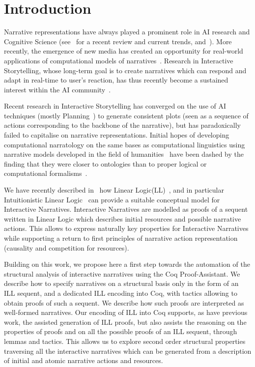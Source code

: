 \documentclass[runningheads,a4paper]{llncs}
\begin{document}
\section{Introduction}
%
Narrative representations have always played a prominent role in AI research and Cognitive Science (see~\cite{Richards09} for a recent review and current trends, and~\cite{AAAI10}). More recently, the emergence of new media has created an opportunity for real-world applications of computational models of narratives~\cite{Laurel93,Murray98}. Research in Interactive Storytelling, whose long-term goal is to create narratives which can respond and adapt in real-time to user's reaction, has thus recently become a sustained interest within the AI community~\cite{AAAI07,AAAI09}.

Recent research in Interactive Storytelling has converged on the use of AI techniques (mostly Planning~\cite{Young99}) to generate consistent plots (seen as a sequence of actions corresponding to the backbone of the narrative), but has paradoxically failed to capitalise on narrative representations. Initial hopes of developing computational narratology on the same bases as computational linguistics using narrative models developed in the field of humanities~\cite{Greimas66,Bremond73} have been dashed by the finding that they were closer to ontologies than to proper logical or computational formalisms~\cite{Cavazza06}.

We have recently described in~\cite{bosser10} how Linear Logic(LL)~\cite{GirardTCS87}, and in particular Intuitionistic Linear Logic~\cite{GirardILL87} can provide a suitable conceptual model for Interactive Narratives. Interactive Narratives are modelled as proofs of a sequent written in Linear Logic which describes initial resources and possible narrative actions. This allows to express naturally key properties for Interactive Narratives while supporting a return to first principles of narrative action representation (causality and competition for resources).

Building on this work, we propose here a first step towards the automation of the structural analysis of interactive narratives using the Coq Proof-Assistant. We describe how to specify narratives on a structural basis only in the form of an ILL sequent, and a dedicated ILL encoding into Coq, with tactics allowing to obtain proofs of such a sequent. We describe how such proofs are interpreted as well-formed narratives. Our encoding of ILL into Coq supports, as have previous work, the assisted generation of ILL proofs, but also assists the reasoning on the properties of proofs and on all the possible proofs of an ILL sequent, through lemmas and tactics. This allows us to explore second order structural properties traversing all the interactive narratives which can be generated from a description of initial and atomic narrative actions and resources.
\end{document}
